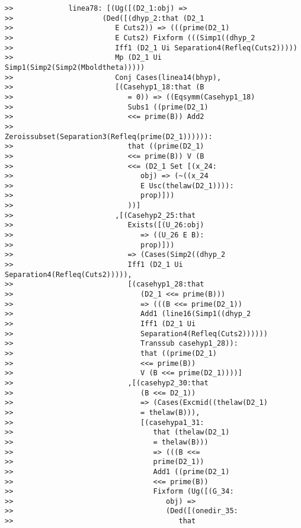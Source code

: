 \documentclass[12pt]{article}
\begin{document}
\begin{verbatim}
>>             linea78: [(Ug([(D2_1:obj) =>
>>                     (Ded([(dhyp_2:that (D2_1
>>                        E Cuts2)) => (((prime(D2_1)
>>                        E Cuts2) Fixform (((Simp1((dhyp_2
>>                        Iff1 (D2_1 Ui Separation4(Refleq(Cuts2)))))
>>                        Mp (D2_1 Ui Simp1(Simp2(Simp2(Mboldtheta)))))
>>                        Conj Cases(linea14(bhyp),
>>                        [(Casehyp1_18:that (B
>>                           = 0)) => ((Eqsymm(Casehyp1_18)
>>                           Subs1 ((prime(D2_1)
>>                           <<= prime(B)) Add2
>>                           Zeroissubset(Separation3(Refleq(prime(D2_1)))))):
>>                           that ((prime(D2_1)
>>                           <<= prime(B)) V (B
>>                           <<= (D2_1 Set [(x_24:
>>                              obj) => (~((x_24
>>                              E Usc(thelaw(D2_1)))):
>>                              prop)]))
>>                           ))]
>>                        ,[(Casehyp2_25:that
>>                           Exists([(U_26:obj)
>>                              => ((U_26 E B):
>>                              prop)]))
>>                           => (Cases(Simp2((dhyp_2
>>                           Iff1 (D2_1 Ui Separation4(Refleq(Cuts2))))),
>>                           [(casehyp1_28:that
>>                              (D2_1 <<= prime(B)))
>>                              => (((B <<= prime(D2_1))
>>                              Add1 (line16(Simp1((dhyp_2
>>                              Iff1 (D2_1 Ui
>>                              Separation4(Refleq(Cuts2))))))
>>                              Transsub casehyp1_28)):
>>                              that ((prime(D2_1)
>>                              <<= prime(B))
>>                              V (B <<= prime(D2_1))))]
>>                           ,[(casehyp2_30:that
>>                              (B <<= D2_1))
>>                              => (Cases(Excmid((thelaw(D2_1)
>>                              = thelaw(B))),
>>                              [(casehypa1_31:
>>                                 that (thelaw(D2_1)
>>                                 = thelaw(B)))
>>                                 => (((B <<=
>>                                 prime(D2_1))
>>                                 Add1 ((prime(D2_1)
>>                                 <<= prime(B))
>>                                 Fixform (Ug([(G_34:
>>                                    obj) =>
>>                                    (Ded([(onedir_35:
>>                                       that

\end{verbatim}
\end{document}
